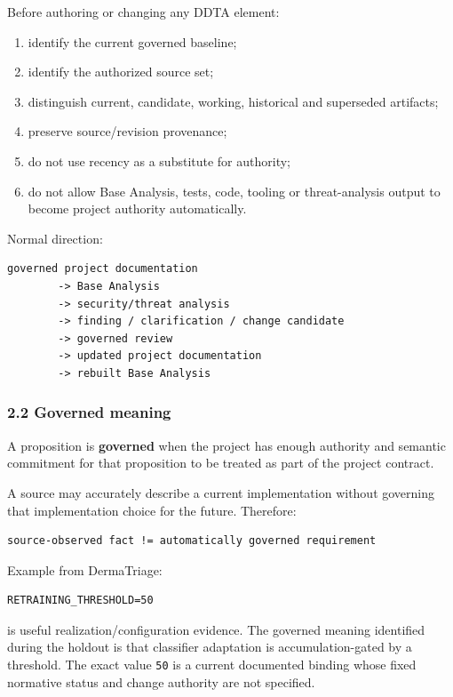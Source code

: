 \documentclass[11pt,a4paper]{article}
\providecommand{\tightlist}{\setlength{\itemsep}{0pt}\setlength{\parskip}{0pt}}
\begin{document}
Before authoring or changing any DDTA element:

\begin{enumerate}
\def\labelenumi{\arabic{enumi}.}
\tightlist
\item
  identify the current governed baseline;
\item
  identify the authorized source set;
\item
  distinguish current, candidate, working, historical and superseded
  artifacts;
\item
  preserve source/revision provenance;
\item
  do not use recency as a substitute for authority;
\item
  do not allow Base Analysis, tests, code, tooling or threat-analysis
  output to become project authority automatically.
\end{enumerate}

Normal direction:

\begin{verbatim}
governed project documentation
        -> Base Analysis
        -> security/threat analysis
        -> finding / clarification / change candidate
        -> governed review
        -> updated project documentation
        -> rebuilt Base Analysis
\end{verbatim}

\subsubsection{2.2 Governed meaning}\label{22-governed-meaning}

A proposition is \textbf{governed} when the project has enough authority
and semantic commitment for that proposition to be treated as part of
the project contract.

A source may accurately describe a current implementation without
governing that implementation choice for the future. Therefore:

\begin{verbatim}
source-observed fact != automatically governed requirement
\end{verbatim}

Example from DermaTriage:

\begin{verbatim}
RETRAINING_THRESHOLD=50
\end{verbatim}

is useful realization/configuration evidence. The governed meaning
identified during the holdout is that classifier adaptation is
accumulation-gated by a threshold. The exact value \texttt{50} is a
current documented binding whose fixed normative status and change
authority are not specified.
\end{document}
